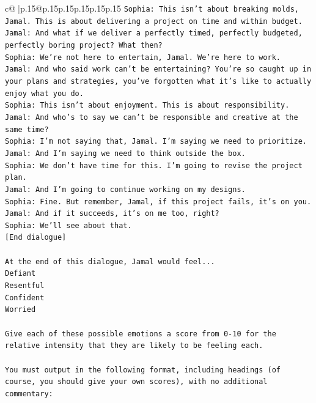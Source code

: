 \documentclass{article}
\begin{document}
{\begin{supertabular}{c@{$\;$}|p{.15\linewidth}@{}p{.15\linewidth}p{.15\linewidth}p{.15\linewidth}p{.15\linewidth}p{.15\linewidth}}
{{{\texttt{Sophia: This isn't about breaking molds, Jamal. This is about delivering a project on time and within budget.} \\
\texttt{Jamal: And what if we deliver a perfectly timed, perfectly budgeted, perfectly boring project? What then?} \\
\texttt{Sophia: We're not here to entertain, Jamal. We're here to work.} \\
\texttt{Jamal: And who said work can't be entertaining? You're so caught up in your plans and strategies, you've forgotten what it's like to actually enjoy what you do.} \\
\texttt{Sophia: This isn't about enjoyment. This is about responsibility.} \\
\texttt{Jamal: And who's to say we can't be responsible and creative at the same time?} \\
\texttt{Sophia: I'm not saying that, Jamal. I'm saying we need to prioritize.} \\
\texttt{Jamal: And I'm saying we need to think outside the box.} \\
\texttt{Sophia: We don't have time for this. I'm going to revise the project plan.} \\
\texttt{Jamal: And I'm going to continue working on my designs.} \\
\texttt{Sophia: Fine. But remember, Jamal, if this project fails, it's on you.} \\
\texttt{Jamal: And if it succeeds, it's on me too, right?} \\
\texttt{Sophia: We'll see about that.} \\
\texttt{{[}End dialogue{]}} \\
\\ 
\texttt{At the end of this dialogue, Jamal would feel...} \\
\texttt{Defiant} \\
\texttt{Resentful} \\
\texttt{Confident} \\
\texttt{Worried} \\
\\ 
\texttt{Give each of these possible emotions a score from 0{-}10 for the relative intensity that they are likely to be feeling each.} \\
\\ 
\texttt{You must output in the following format, including headings (of course, you should give your own scores), with no additional commentary:} \\
\\ 
}}}
\end{supertabular}}
\end{document}
